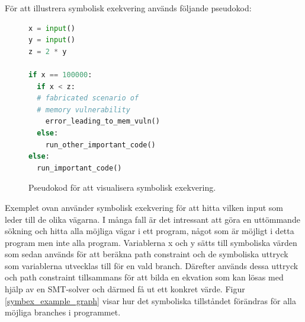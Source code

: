 För att illustrera symbolisk exekvering används följande pseudokod:

\begin{figure}[H]
\centering
\begin{lstlisting}[label={list:first}, language=Python, frame=single]
x = input()
y = input()
z = 2 * y

if x == 100000: 
  if x < z:
  # fabricated scenario of 
  # memory vulnerability
    error_leading_to_mem_vuln()
  else:
    run_other_important_code()
else:
  run_important_code()

\end{lstlisting}
\caption{Pseudokod för att visualisera symbolisk exekvering.}
\label{symbex_example_code}
\end{figure}

Exemplet ovan använder symbolisk exekvering för att hitta vilken input som leder
till de olika vägarna. I många fall är det intressant att göra en uttömmande
sökning och hitta alla möjliga vägar i ett program, något som är möjligt i detta
program men inte alla program. Variablerna x och y sätts till symboliska värden
som sedan används för att beräkna path constraint och de symboliska uttryck som
variablerna utvecklas till för en vald branch. Därefter används dessa uttryck
och path constraint tillsammans för att bilda en ekvation som kan lösas med
hjälp av en SMT-solver och därmed få ut ett konkret värde. Figur
\ref{symbex_example_graph} visar hur
det symboliska tillståndet förändras för alla möjliga branches i programmet.

